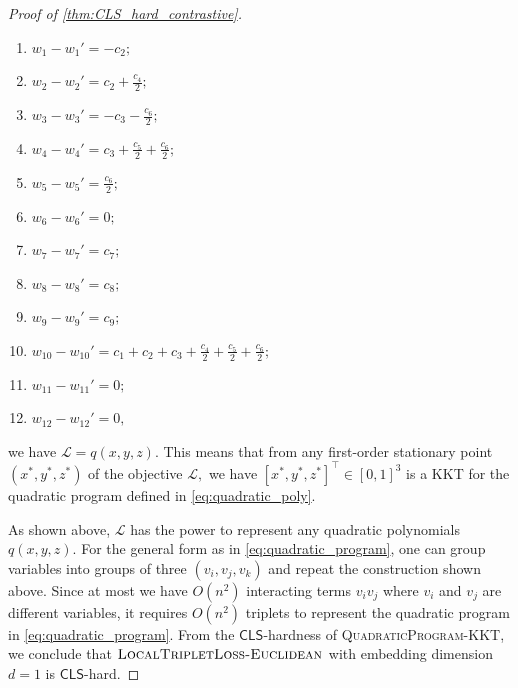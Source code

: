 \documentclass{article}
\theoremstyle{definition}  %
\theoremstyle{plain}
\numberwithin{observation}{section}
\numberwithin{claim}{section}
\numberwithin{fact}{section}
\numberwithin{lemma}{section}
\numberwithin{proposition}{section}
\numberwithin{theorem}{section}
\numberwithin{corollary}{section}
\numberwithin{definition}{section}
\newcommand{\CLS}{\mathsf{CLS}}
\newcommand{\Contrastive}{\textsc{LocalTripletLoss-Euclidean}}
\theoremstyle{plain}
\begin{document}
\begin{proof}[Proof of \cref{thm:CLS_hard_contrastive}]
\begin{enumerate}[label = ]
    \item $w_1 - w_1' = - c_2;$
    \item $w_2 - w_2' = c_2 + \frac{c_4}{2};$
    \item $w_3 - w_3' = -c_3 - \frac{c_6}{2};$
    \item $w_4 - w_4' = c_3 + \frac{c_5}{2} + \frac{c_6}{2};$
    \item $w_5 - w_5' = \frac{c_6}{2};$
    \item $w_6 - w_6' = 0;$
    \item $w_7 - w_7' = c_7;$
    \item $w_8 - w_8' = c_8;$
    \item $w_9 - w_9' = c_9;$
    \item $w_{10} - w_{10}' = c_1 + c_2 + c_3 + \frac{c_4}{2} + \frac{c_5}{2} + \frac{c_6}{2};$
    \item $w_{11} - w_{11}' = 0;$
    \item $w_{12} - w_{12}' = 0,$
\end{enumerate}
we have $\mathcal{L} = q(x, y, z).$ This means that from any first-order stationary point $(x^*, y^*, z^*)$ of the objective $\mathcal{L},$ we have $[x^*, y^*, z^*]^\top \in [0, 1]^3$ is a KKT for the quadratic program defined in \eqref{eq:quadratic_poly}. 

As shown above, $\mathcal{L}$ has the power to represent any quadratic polynomials $q(x, y, z)$. For the general form as in \eqref{eq:quadratic_program}, one can group variables into groups of three $(v_i, v_j ,v_k)$ and repeat the construction shown above. Since at most we have $O(n^2)$ interacting terms $v_iv_j$ where $v_i$ and $v_j$ are different variables, it requires $O(n^2)$ triplets to represent the quadratic program in \eqref{eq:quadratic_program}. From the $\CLS$-hardness of \textsc{QuadraticProgram-KKT}, we conclude that $\Contrastive$ with embedding dimension $d = 1$ is $\CLS$-hard.



\end{proof}
\end{document}

